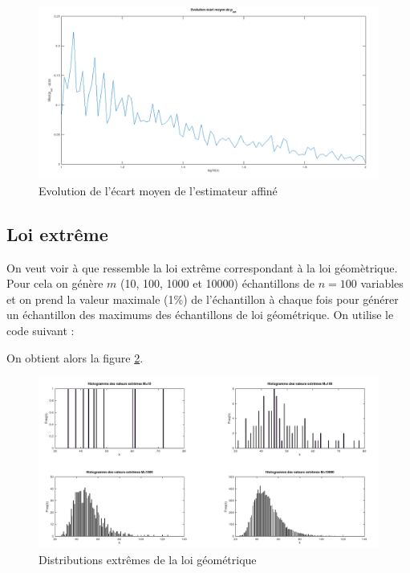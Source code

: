 \documentclass[12pt,a4paper,titlepage]{article}
\numberwithin{equation}{section}
\begin{document}
\begin{figure}[!h]
\begin{center}
 \includegraphics[scale=0.3]{images/biaisMoyGeomBis.png} 
\end{center}
 \caption{Evolution de l'écart moyen de l'estimateur affiné}
 \label{Evolution de l'ecart moyen de de l'estimateur affiné geom}
\end{figure}


\subsection{Loi extrême}

On veut voir à que ressemble la loi extrême correspondant à la loi géomètrique. Pour cela on génère $m$ (10, 100, 1000 et 10000) échantillons de $n=100$ variables et on prend la valeur maximale (1\%) de l'échantillon à chaque fois pour générer un échantillon des maximums des échantillons de loi géométrique. On utilise le code suivant :



On obtient alors la figure \ref{Distributions extrêmes de la loi géométrique}.

\begin{figure}[!h]
\begin{center}
 \includegraphics[scale=0.4]{images/extremGeom.png} 
\end{center}
 \caption{Distributions extrêmes de la loi géométrique}
 \label{Distributions extrêmes de la loi géométrique}
\end{figure}
\end{document}
